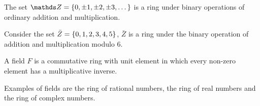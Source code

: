 \documentclass[../main-sheet.tex]{subfiles}
\begin{document}
\begin{ex}
    The set $ \Z =\set{0,\pm1,\pm2,\pm3,\dots} $ is a ring under binary operations of ordinary addition and multiplication.
\end{ex}
\begin{ex}
    Consider the set $ \bar{Z}=\left\{0,1,2,3,4,5\right\} $, $ \bar{Z} $ is a ring under the binary operation of addition and multiplication modulo 6.
\end{ex}
\begin{defn}[Field]
A field $ F $ is a commutative ring with unit element in which every non-zero element has a multiplicative inverse.
\end{defn}
\begin{ex}
    Examples of fields are the ring of rational numbers, the ring of real numbers and the ring of complex numbers.
\end{ex}
\end{document}
